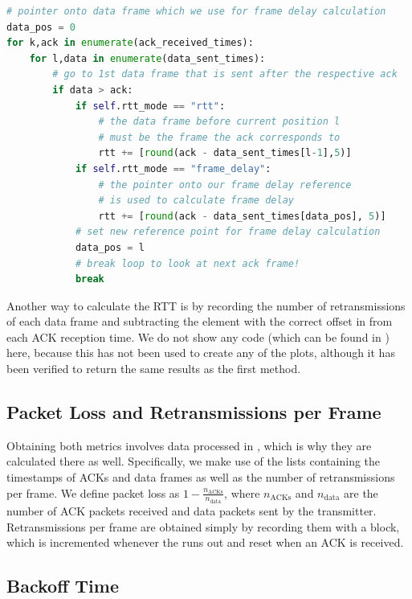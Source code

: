 \begin{lstlisting}[language=Python, caption={[{Alternative method to calculate RTT and frame delay}](The method used in \code{rtt\_alternative.py} to calculate RTT and frame delay)},label=lst:rtt]
# pointer onto data frame which we use for frame delay calculation
data_pos = 0
for k,ack in enumerate(ack_received_times):
    for l,data in enumerate(data_sent_times):
		# go to 1st data frame that is sent after the respective ack 
        if data > ack:
            if self.rtt_mode == "rtt":
				# the data frame before current position l 
				# must be the frame the ack corresponds to
                rtt += [round(ack - data_sent_times[l-1],5)]
            if self.rtt_mode == "frame_delay":
				# the pointer onto our frame delay reference
				# is used to calculate frame delay
                rtt += [round(ack - data_sent_times[data_pos], 5)]
			# set new reference point for frame delay calculation
            data_pos = l
			# break loop to look at next ack frame!
            break
\end{lstlisting} 

Another way to calculate the RTT is by recording the number of retransmissions of each data frame and subtracting the element with the correct offset in  from each ACK reception time. We do not show any code (which can be found in ) here, because this has not been used to create any of the plots, although it has been verified to return the same results as the first method. 

\subsection{Packet Loss and Retransmissions per Frame}

Obtaining both metrics involves data processed in , which is why they are calculated there as well. Specifically, we make use of the lists containing the timestamps of ACKs and data frames as well as the number of retransmissions per frame. 
We define packet loss as $ 1 - \frac{n_\text{ACKs}}{n_\text{data}} $, where $ n_\text{ACKs} $ and $ n_\text{data} $ are the number of ACK packets received and data packets sent by the transmitter.
Retransmissions per frame are obtained simply by recording them with a  block, which is incremented whenever the  runs out and reset when an ACK is received.

\subsection{Backoff Time}

